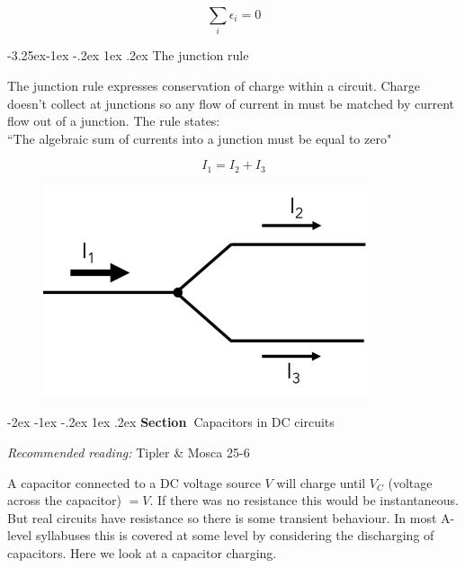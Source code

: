 \documentclass[
]{book}
\makeatletter
\renewcommand\section{%
\@startsection{section}{1}{\z@}%
              {-2ex \@plus -1ex \@minus -.2ex}%
              {1ex \@plus .2ex}%
              {\sffamily\bfseries\large\noindent Section~}}
\renewcommand\subsection{%
\@startsection{subsection}{2}{\z@}%
              {-3.25ex\@plus -1ex \@minus -.2ex}%
              {1ex \@plus .2ex}%
              {\sffamily\bfseries}}
\numberwithin{equation}{section}
\makeatother
\begin{document}
\begin{equation}
\label{eq:sumEpsilon}
\sum_i \epsilon_i =0
\end{equation}

\hypertarget{the-junction-rule}{%
\subsection{The junction rule}\label{the-junction-rule}}

The junction rule expresses conservation of charge within a circuit.
Charge doesn't collect at junctions so any flow of current in must be
matched by current flow out of a junction. The rule states:\\

``The algebraic sum of currents into a junction must be equal to zero"

\begin{equation}
\label{eq:sumCurrents}
I_1 = I_2 + I_3
\end{equation}

\begin{figure}

{\centering \includegraphics[width=0.7\linewidth]{Figures/junction_rule} 

}

\end{figure}

\hypertarget{capacitors-in-dc-circuits}{%
\section{Capacitors in DC circuits}\label{capacitors-in-dc-circuits}}

\emph{Recommended reading:} Tipler \& Mosca 25-6

A capacitor connected to a DC voltage source \(V\) will charge until
\(V _C\) (voltage across the capacitor) \(= V\). If there was no resistance
this would be instantaneous. But real circuits have resistance so there
is some transient behaviour. In most A-level syllabuses this is covered
at some level by considering the discharging of capacitors. Here we look
at a capacitor charging.
\end{document}
